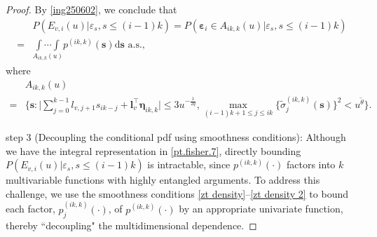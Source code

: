 \documentclass[ejsv2]{imsart}
\theoremstyle{plain}
\theoremstyle{definition}
\theoremstyle{remark}
\begin{document}
\begin{proof}
By \eqref{ing250602}, we conclude that
\begin{equation}\label{pt.fisher.7}
\begin{split}
     & P(E_{v,i}(u)|\varepsilon_s,s\leq (i-1)k)=P(\bm{\varepsilon}_i \in A_{ik,k}(u)|\varepsilon_s,s\leq (i-1)k)\\ =&
     \underset{A_{ik, k}(u)}{\int\cdots\int}p^{(ik, k)}(\mathbf{s})\mathrm{d}\mathbf{s}\,\, \textrm{a.s.},
\end{split}
\end{equation}
where
\begin{equation*}%
\begin{split}
&A_{ik,k}(u)\\
=&\bigg\{\mathbf{s}: \bigg|\sum_{j=0}^{k-1}l_{v,j+1}s_{ik-j}+\bm{l}_v^\top\bm{\eta}_{ik, k}\bigg|
\leq 3u^{-\frac{1}{2q}},\max\limits_{(i-1)k+1\leq j\leq ik}\{\tilde{\sigma}^{(ik,k)}_{j}(\mathbf{s})\}^2<u^{\tilde{\theta}}\bigg\}.
\end{split}
\end{equation*}

\vspace{0.3cm}
{\sc step 3 (Decoupling the conditional pdf using smoothness conditions):}
Although we have the integral representation in 
\eqref{pt.fisher.7},
directly bounding
$P(E_{v,i}(u)|\varepsilon_s,s\leq (i-1)k)$
is intractable, since 
$p^{(ik, k)}(\cdot)$
factors into $k$ multivariable functions with highly entangled arguments.
To address this challenge, we use the smoothness conditions \eqref{zt density}--\eqref{zt density 2}
to bound each factor, $p^{(ik,k)}_j(\cdot)$, of
$p^{(ik, k)}(\cdot)$ by an appropriate univariate function, thereby ``decoupling" the multidimensional dependence.









\end{proof}
\end{document}
